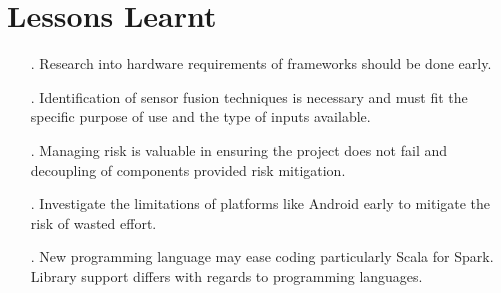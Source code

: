 \documentclass[prodmode,acmtosem]{acmsmall} %
\begin{document}
\section{Lessons Learnt}
\begin{itemize}
\item[.] Research into hardware requirements of frameworks should be done early.
\item[.] Identification of sensor fusion techniques is necessary and must fit the specific purpose of use and the type of inputs available.
\item[.] Managing risk is valuable in ensuring the project does not fail and decoupling of components provided risk mitigation.
\item[.] Investigate the limitations of platforms like Android early to mitigate the risk of wasted effort.
\item[.] New programming language may ease coding particularly Scala for Spark. Library support differs with regards to programming languages.
\end{itemize}
\end{document}
